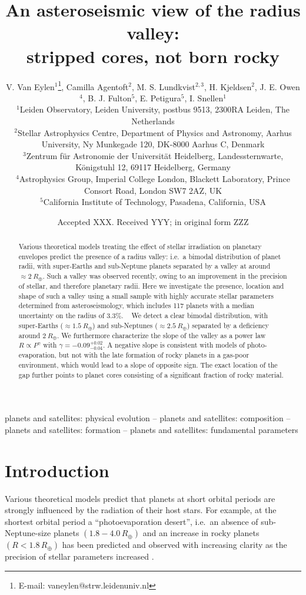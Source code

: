 \documentclass[a4paper,fleqn,usenatbib]{mnras}
\title[]{An asteroseismic view of the radius valley:\\ stripped cores, not born rocky}
\author[V. Van Eylen et al.]{V. Van Eylen$^{1}$\thanks{E-mail: vaneylen@strw.leidenuniv.nl},
Camilla Agentoft$^{2}$,
M. S. Lundkvist$^{2,3}$,
H. Kjeldsen$^{2}$,\newauthor
J. E. Owen$^{4}$,
B. J. Fulton$^{5}$,
E. Petigura$^{5}$,
I. Snellen$^{1}$
\\
$^{1}$Leiden Observatory, Leiden University, postbus 9513, 2300RA Leiden, The Netherlands\\
$^{2}$Stellar Astrophysics Centre, Department of Physics and Astronomy, Aarhus University, Ny Munkegade 120, DK-8000 Aarhus C, Denmark\\
$^{3}$Zentrum f\"{u}r Astronomie der Universit\"{a}t Heidelberg, Landessternwarte, K\"{o}nigstuhl 12, 69117 Heidelberg, Germany\\
$^{4}$Astrophysics Group, Imperial College London, Blackett Laboratory, Prince Consort Road, London SW7 2AZ, UK\\
$^{5}$California Institute of Technology, Pasadena, California, USA\\
}
\date{Accepted XXX. Received YYY; in original form ZZZ}
\begin{document}
\label{firstpage}
\pagerange{\pageref{firstpage}--\pageref{lastpage}}
\maketitle

\begin{abstract}
Various theoretical models treating the effect of stellar irradiation on planetary envelopes predict the presence of a radius valley: i.e.\ a bimodal distribution of planet radii, with super-Earths and sub-Neptune planets separated by a valley at around $\approx 2~R_\oplus$. Such a valley was observed recently, owing to an improvement in the precision of stellar, and therefore planetary radii. Here we investigate the presence, location and shape of such a valley using a small sample with highly accurate stellar parameters determined from asteroseismology, which includes 117 planets with a median uncertainty on the radius of 3.3\%. 
~
We detect a clear bimodal distribution, with super-Earths ($\approx 1.5~R_\oplus$) and sub-Neptunes ($\approx 2.5~R_\oplus$) separated by a deficiency around $2~R_\oplus$. We furthermore characterize the slope of the valley as a power law $R \propto P^\gamma$ with $\gamma = {-0.09^{+0.02}_{-0.04}}$. A negative slope is consistent with models of photo-evaporation, but not with the late formation of rocky planets in a gas-poor environment, which would lead to a slope of opposite sign. The exact location of the gap further points to planet cores consisting of a significant fraction of rocky material.
\end{abstract}
  
\begin{keywords}
planets and satellites: physical evolution -- planets and satellites: composition -- planets and satellites: formation -- planets and satellites: fundamental parameters
\end{keywords}



\section{Introduction}

Various theoretical models predict that planets at short orbital periods are strongly influenced by the radiation of their host stars. For example, at the shortest orbital period a ``photoevaporation desert'', i.e.\ an absence of sub-Neptune-size planets $(1.8-4.0\,R_\oplus)$ and an increase in rocky planets $(R{<}1.8\,R_\oplus)$ has been predicted \citep{lopez2013} and observed with increasing clarity as the precision of stellar parameters increased \citep{borucki2011,lundkvist2016}. 
\end{document}

